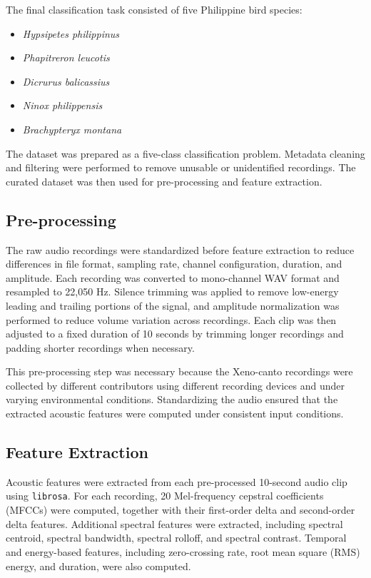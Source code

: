 \documentclass[runningheads]{llncs}
\begin{document}
The final classification task consisted of five Philippine bird species:

\begin{itemize}
    \item \textit{Hypsipetes philippinus}
    \item \textit{Phapitreron leucotis}
    \item \textit{Dicrurus balicassius}
    \item \textit{Ninox philippensis}
    \item \textit{Brachypteryx montana}
\end{itemize}

The dataset was prepared as a five-class classification problem. Metadata cleaning and filtering were performed to remove unusable or unidentified recordings. The curated dataset was then used for pre-processing and feature extraction.

\subsection{Pre-processing}

The raw audio recordings were standardized before feature extraction to reduce differences in file format, sampling rate, channel configuration, duration, and amplitude. Each recording was converted to mono-channel WAV format and resampled to 22{,}050 Hz. Silence trimming was applied to remove low-energy leading and trailing portions of the signal, and amplitude normalization was performed to reduce volume variation across recordings. Each clip was then adjusted to a fixed duration of 10 seconds by trimming longer recordings and padding shorter recordings when necessary.

This pre-processing step was necessary because the Xeno-canto recordings were collected by different contributors using different recording devices and under varying environmental conditions. Standardizing the audio ensured that the extracted acoustic features were computed under consistent input conditions.

\subsection{Feature Extraction}

Acoustic features were extracted from each pre-processed 10-second audio clip using \texttt{librosa}. For each recording, 20 Mel-frequency cepstral coefficients (MFCCs) were computed, together with their first-order delta and second-order delta features. Additional spectral features were extracted, including spectral centroid, spectral bandwidth, spectral rolloff, and spectral contrast. Temporal and energy-based features, including zero-crossing rate, root mean square (RMS) energy, and duration, were also computed.
\end{document}
